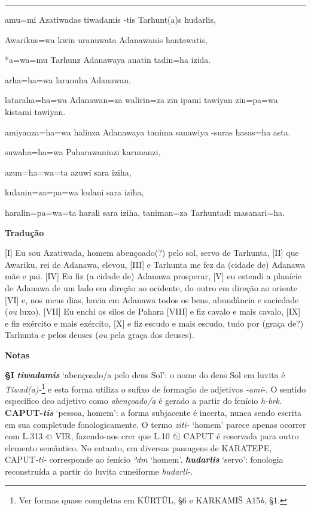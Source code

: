 \vspace{10pt}
\hrule
\vspace{10pt}


\setcounter{parcount}{0}
\begin{parnumbersr}

	\raggedright%
	\itshape%

	amu=mi Azatiwadas tiwadamis -tis Tarhunt{(a)}s hudarlis,

	Awarikus=wa \lbreak{} kwin uranuwata Adanawanis hantawatis,

	*a=wa=mu Tarhunz Adanawaya anatin tadin=ha izida.

	arha=ha=wa laranuha Adanawan.

	lataraha=ha=wa Adanawan=za walirin=za zin ipami tawiyan zin=pa=wa kistami
	tawiyan.

	amiyanza=ha=wa halinza Adanawaya tanima sanawiya -suras
	hasas=ha asta.

	suwaha=ha=wa Paharawaninzi karunanzi,

	azun=ha=wa=ta azuwi sara iziha,

	kulanin=za=pa=wa kulani sara iziha,

	haralin=pa=wa=ta harali sara iziha, taniman=za Tarhuntadi masanari=ha.


\end{parnumbersr}


\clearpage%
\noindent\textbf{Tradução}

[I] Eu sou Azatiwada, homem abençoado{(?)} pelo sol, servo de Tarhunta, [II] que
Awariku, rei de Adanawa, elevou, [III] e Tarhunta me fez da (cidade de)
Adanawa mãe e pai. [IV] Eu fiz (a cidade de) Adanawa prosperar, [V] eu estendi
a planície de Adanawa de um lado em direção ao ocidente, do outro em direção
ao oriente [VI] e, nos meus dias, havia em Adanawa todos os bens, abundância e
saciedade (\emph{ou} luxo). [VII] Eu enchi os silos de Pahara [VIII] e fiz
cavalo e mais cavalo, [IX] e fiz exército e mais exército, [X] e fiz escudo e
mais escudo, tudo por {(graça de?)} Tarhunta e pelos deuses (\emph{ou} pela
graça dos deuses).

\bigskip
\noindent\textbf{Notas}

\smallskip
\noindent\textbf{§I}\tabto{2em}
\textbf{\emph{tiwadamis}} `abençoado/a pelo deus Sol': o nome do deus Sol em
luvita é \emph{Tiwad{(a)}-}\footnote{Ver formas quase completas em KÜRTÜL, §6 e
	KARKAMIŠ A15\emph{b}, §1.} e esta forma utiliza o sufixo de formação de
adjetivos \emph{-ami-}.
O sentido específico deo adjetivo como \emph{abençoado/a} é gerado a partir do
fenício \emph{h-brk}.
\textbf{CAPUT-\emph{tis}} `pessoa, homem': a forma subjacente é incerta, nunca
sendo escrita em sua completude fonologicamente.
O termo \emph{ziti-} `homem' parece apenas ocorrer com L.313 𔕠 VIR, fazendo-nos
crer que L.10 𔐉 CAPUT é reservada para outro elemento semântico.
No entanto, em diversas passagens de KARATEPE, CAPUT\emph{-ti-} corresponde ao
fenício \emph{ʾdm} `homem'.
\textbf{\emph{hudarlis}} `servo': fonologia reconstruída a partir do
luvita cuneiforme \emph{hudarli-}.

